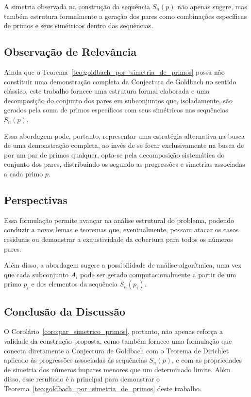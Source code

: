 \documentclass[a4paper,11pt]{article}
\theoremstyle{definition}
\theoremstyle{remark}
\begin{document}
\begin{otherlanguage}{brazil}
	A simetria observada na construção da sequência \(S_n(p)\) não apenas sugere, mas também estrutura formalmente a geração dos pares como combinações específicas de primos e seus simétricos dentro das sequências.
	
	\subsection{Observação de Relevância}
	Ainda que o Teorema~\ref{teo:goldbach_por_simetria_de_primos} possa não constituir uma demonstração completa da Conjectura de Goldbach no sentido clássico, este trabalho fornece uma estrutura formal elaborada e uma decomposição do conjunto dos pares em subconjuntos que, isoladamente, são gerados pela soma de primos específicos com seus simétricos nas sequências \(S_n(p)\).
	
	Essa abordagem pode, portanto, representar uma estratégia alternativa na busca de uma demonstração completa, ao invés de se focar exclusivamente na busca de por um par de primos qualquer, opta-se pela decomposição sistemática do conjunto dos pares, distribuindo-os segundo as progressões e simetrias associadas a cada primo \(p\).
	
	\subsection{Perspectivas}
	Essa formulação permite avançar na análise estrutural do problema, podendo conduzir a novos lemas e teoremas que, eventualmente, possam atacar os casos residuais ou demonstrar a exaustividade da cobertura para todos os números pares.
	
	Além disso, a abordagem sugere a possibilidade de análise algorítmica, uma vez que cada subconjunto \(A_i\) pode ser gerado computacionalmente a partir de um primo \(p_i\) e dos elementos da sequência \(S_n(p_i)\).
	
	\subsection{Conclusão da Discussão}
	O Corolário~\ref{coro:par_simetrico_primos}, portanto, não apenas reforça a validade da construção proposta, como também fornece uma formulação que conecta diretamente a Conjectura de Goldbach com o Teorema de Dirichlet aplicado às progressões associadas às sequências \(S_n(p)\), e com as propriedades de simetria dos números ímpares menores que um determinado limite. Além disso, esse resultado é a principal para demonstrar o Teorema~\ref{teo:goldbach_por_simetria_de_primos} deste trabalho.
	

\end{otherlanguage}
\end{document}
